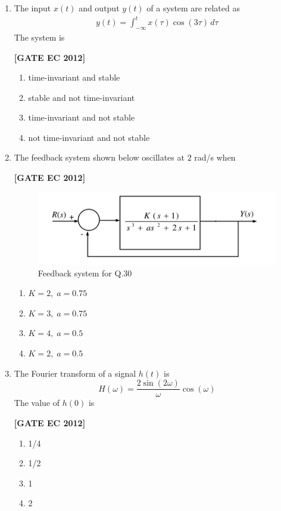 \documentclass[12pt]{article}
\begin{document}
\begin{enumerate}[leftmargin=1.0em, label=\textbf{Q.\arabic*.}, itemsep=2em]
\begin{enumerate}[leftmargin=2.5em, label=\textbf{Q.\arabic*.}, itemsep=2em, start=26]
\item The input $x(t)$ and output $y(t)$ of a system are related as
\begin{align*}
y(t) = \int_{-\infty}^{t} x(\tau)\cos(3\tau) \, d\tau
\end{align*}
The system is

\noindent \textbf{[GATE EC 2012]}
\begin{multicols}{2}
    \begin{enumerate}
        \item time-invariant and stable
        \item stable and not time-invariant
        \item time-invariant and not stable
        \item not time-invariant and not stable
    \end{enumerate}
\end{multicols}

\item The feedback system shown below oscillates at $2$ rad/s when

\noindent \textbf{[GATE EC 2012]}
\begin{figure}[H]\centering
\includegraphics[width=0.5\columnwidth]{figs/q30.png}
\caption{Feedback system for Q.30}
\label{fig:q30}
\end{figure}
\begin{multicols}{2}
    \begin{enumerate}
        \item $K=2, \; a=0.75$
        \item $K=3, \; a=0.75$
        \item $K=4, \; a=0.5$
        \item $K=2, \; a=0.5$
    \end{enumerate}
\end{multicols}

\item The Fourier transform of a signal $h(t)$ is
\[
H(\omega) = \frac{2\sin(2\omega)}{\omega}\cos(\omega)
\]
The value of $h(0)$ is

\noindent \textbf{[GATE EC 2012]}
\begin{multicols}{2}
    \begin{enumerate}
        \item 1/4
        \item 1/2
        \item 1
        \item 2
    \end{enumerate}
\end{multicols}


\end{enumerate}
\end{enumerate}
\end{document}
